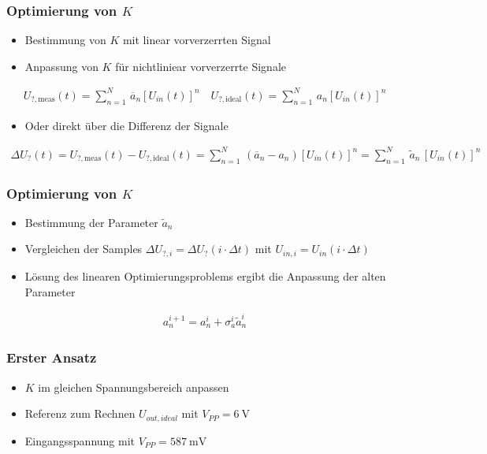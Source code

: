 \begin{frame}[fragile]
\frametitle{Optimierung von $K$}

\begin{itemize}
  \item Bestimmung von $K$ mit linear vorverzerrten Signal
  \item Anpassung von $K$ für nichtliniear vorverzerrte Signale
\end{itemize}

\begin{align}
	U_{?, \mathrm{meas}} (t) = \sum_{n=1}^N \, \overline{a}_n \left[ U_{in}(t)\right]^n
	\quad
	U_{?, \mathrm{ideal}} (t) = \sum_{n=1}^N \, a_n \left[ U_{in}(t) \right]^n
\end{align}
\begin{itemize}
  \item Oder direkt über die Differenz der Signale
\end{itemize}
\begin{align}
	\Delta U_? (t) = U_{?, \mathrm{meas}} (t) - U_{?, \mathrm{ideal}} (t)
	=
	\sum_{n=1}^N \, \left( \overline{a}_n -  a_n\right) \left[ U_{in}(t) \right]^n
	=
	\sum_{n=1}^N \, \tilde{a}_n \, \left[ U_{in}(t) \right]^n
\end{align}
\end{frame}

\begin{frame}[fragile]
\frametitle{Optimierung von $K$}
\begin{itemize}
	\item Bestimmung der Parameter $\tilde{a}_n$
	\item Vergleichen der Samples ${\Delta U_{?,i} = \Delta U_? (i \cdot \Delta t)}$ mit ${U_{in,i} = U_{in}(i \cdot \Delta t)}$
	\item Lösung des linearen Optimierungsproblems ergibt die Anpassung der alten Parameter
\end{itemize}
\begin{align}
	a_n^{i+1} = a_n^{i} + \sigma_{a}^{i} \tilde{a}_n^{i}
\end{align}
\end{frame}

\begin{frame}
\frametitle{Erster Ansatz}
\begin{itemize}
	\item $K$ im gleichen Spannungsbereich anpassen
	\item Referenz zum Rechnen $U_{out,ideal}$ mit $V_{PP}=\SI{6}{\V}$
	\item Eingangsspannung mit $V_{PP}=\SI{587}{\mV}$
\end{itemize}
\end{frame}

